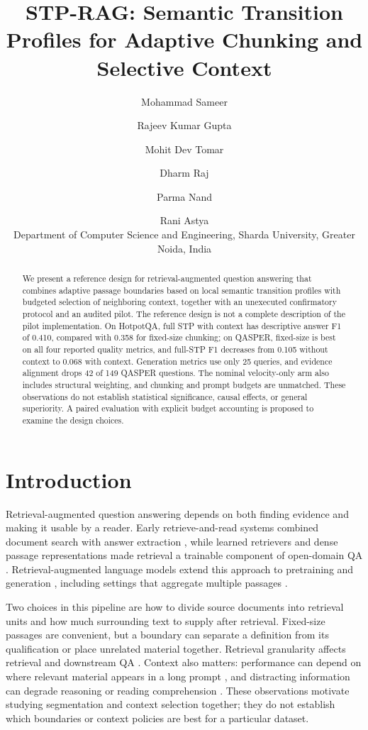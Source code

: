 \documentclass[10pt]{article}
\title{STP-RAG: Semantic Transition Profiles for Adaptive Chunking and Selective Context}
\author{Mohammad Sameer \and Rajeev Kumar Gupta \and Mohit Dev Tomar \and Dharm Raj \and Parma Nand \and Rani Astya \\ Department of Computer Science and Engineering, Sharda University, Greater Noida, India}
\date{}
\begin{document}
\maketitle

\begin{abstract}
We present a reference design for retrieval-augmented question answering that combines adaptive passage boundaries based on local semantic transition profiles with budgeted selection of neighboring context, together with an unexecuted confirmatory protocol and an audited pilot. The reference design is not a complete description of the pilot implementation. On HotpotQA, full STP with context has descriptive answer F1 of 0.410, compared with 0.358 for fixed-size chunking; on QASPER, fixed-size is best on all four reported quality metrics, and full-STP F1 decreases from 0.105 without context to 0.068 with context. Generation metrics use only 25 queries, and evidence alignment drops 42 of 149 QASPER questions. The nominal velocity-only arm also includes structural weighting, and chunking and prompt budgets are unmatched. These observations do not establish statistical significance, causal effects, or general superiority. A paired evaluation with explicit budget accounting is proposed to examine the design choices.
\end{abstract}

\section{Introduction}

Retrieval-augmented question answering depends on both finding evidence and making it usable by a reader. Early retrieve-and-read systems combined document search with answer extraction \cite{Chen2017ReadingWikipedia}, while learned retrievers and dense passage representations made retrieval a trainable component of open-domain QA \cite{Lee2019LatentRetrieval,Karpukhin2020DensePassage}. Retrieval-augmented language models extend this approach to pretraining and generation \cite{Guu2020RealmRetrievalaugmented,Lewis2020RetrievalaugmentedGeneration}, including settings that aggregate multiple passages \cite{Izacard2020LeveragingPassage}.

Two choices in this pipeline are how to divide source documents into retrieval units and how much surrounding text to supply after retrieval. Fixed-size passages are convenient, but a boundary can separate a definition from its qualification or place unrelated material together. Retrieval granularity affects retrieval and downstream QA \cite{Chen2023DenseX}. Context also matters: performance can depend on where relevant material appears in a long prompt \cite{Liu2023LostMiddle}, and distracting information can degrade reasoning or reading comprehension \cite{Shi2023LargeLanguage,Jia2017AdversarialExamples}. These observations motivate studying segmentation and context selection together; they do not establish which boundaries or context policies are best for a particular dataset.
\end{document}
